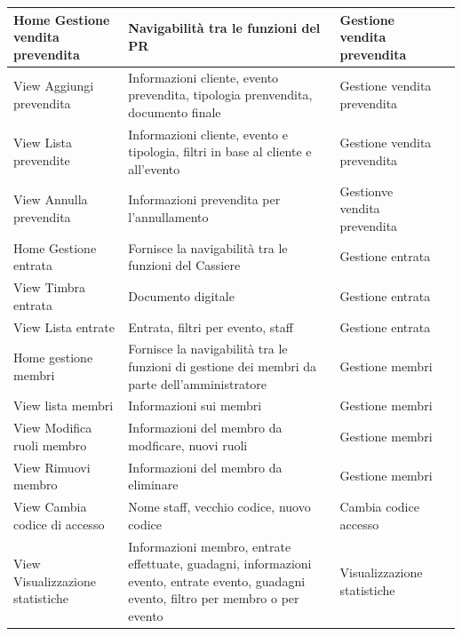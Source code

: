 \documentclass[a4paper]{article}
\begin{document}
\begin{center}
\begin{tabularx}{1\textwidth}{|X|X|X|X|}
    \hline
    Home Gestione vendita prevendita & Navigabilità tra le funzioni del PR & Gestione vendita prevendita\\
    \hline
    View Aggiungi prevendita & Informazioni cliente, evento prevendita, tipologia prenvendita, documento finale & Gestione vendita prevendita\\
    \hline
    View Lista prevendite & Informazioni cliente, evento e tipologia, filtri in base al cliente e all'evento & Gestione vendita prevendita\\
    \hline
    View Annulla prevendita & Informazioni prevendita per l'annullamento & Gestionve vendita prevendita\\
    \hline
    Home Gestione entrata & Fornisce la navigabilità tra le funzioni del Cassiere & Gestione entrata\\
    \hline
    View Timbra entrata & Documento digitale & Gestione entrata\\
    \hline
    View Lista entrate & Entrata, filtri per evento, staff & Gestione entrata\\
    \hline
    Home gestione membri & Fornisce la navigabilità tra le funzioni di gestione dei membri da parte dell'amministratore & Gestione membri\\
    \hline
    View lista membri & Informazioni sui membri & Gestione membri\\
    \hline
    View Modifica ruoli membro & Informazioni del membro da modficare, nuovi ruoli & Gestione membri\\
    \hline
    View Rimuovi membro & Informazioni del membro da eliminare & Gestione membri\\
    \hline
    View Cambia codice di accesso & Nome staff, vecchio codice, nuovo codice & Cambia codice accesso\\
    \hline
    View Visualizzazione statistiche & Informazioni membro, entrate effettuate, guadagni, informazioni evento, entrate evento, guadagni evento, filtro per membro o per evento & Visualizzazione statistiche\\
    \hline
    \end{tabularx}
\end{center}
\end{document}
